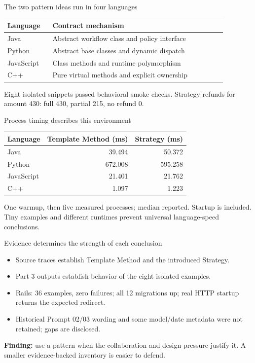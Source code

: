 \documentclass[aspectratio=169,11pt]{beamer}
\begin{document}
\begin{frame}{The two pattern ideas run in four languages}
\begin{tabular}{L{0.18\linewidth}L{0.70\linewidth}}
\toprule Language & Contract mechanism\\\midrule
Java & Abstract workflow class and policy interface\\[0.14cm]
Python & Abstract base classes and dynamic dispatch\\[0.14cm]
JavaScript & Class methods and runtime polymorphism\\[0.14cm]
C++ & Pure virtual methods and explicit ownership\\\bottomrule
\end{tabular}\par
\vspace{0.35cm}
Eight isolated snippets passed behavioral smoke checks. Strategy refunds for amount 430: full 430, partial 215, no refund 0.
\end{frame}
\begin{frame}{Process timing describes this environment}
\centering
\begin{tabular}{lrr}
\toprule Language & Template Method (ms) & Strategy (ms)\\\midrule
Java & 39.494 & 50.372\\
Python & 672.008 & 595.258\\
JavaScript & 21.401 & 21.762\\
C++ & 1.097 & 1.223\\\bottomrule
\end{tabular}\par
\vspace{0.4cm}\raggedright
One warmup, then five measured processes; median reported. Startup is included. Tiny examples and different runtimes prevent universal language-speed conclusions.
\end{frame}
\begin{frame}{Evidence determines the strength of each conclusion}
\begin{itemize}
\item Source traces establish Template Method and the introduced Strategy.
\item Part 3 outputs establish behavior of the eight isolated examples.
\item Rails: 36 examples, zero failures; all 12 migrations up; real HTTP startup returns the expected redirect.
\item Historical Prompt 02/03 wording and some model/date metadata were not retained; gaps are disclosed.
\end{itemize}
\vspace{0.3cm}
\textbf{Finding:} use a pattern when the collaboration and design pressure justify it. A smaller evidence-backed inventory is easier to defend.
\end{frame}
\end{document}
